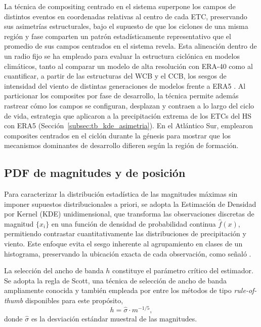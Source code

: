 La técnica de compositing centrado en el sistema superpone los campos de distintos eventos en coordenadas relativas al centro de cada ETC, preservando sus asimetrías estructurales, bajo el supuesto de que los ciclones de una misma región y fase comparten un patrón estadísticamente representativo que el promedio de sus campos centrados en el sistema revela.
Esta alineación dentro de un radio fijo se ha empleado para evaluar la estructura ciclónica en modelos climáticos, tanto al comparar un modelo de alta resolución con ERA-40 \citep{catto2010climate} como al cuantificar, a partir de las estructuras del WCB y el CCB, los sesgos de intensidad del viento de distintas generaciones de modelos frente a ERA5 \citep{priestley2022improved}.
Al particionar los composites por fase de desarrollo, la técnica permite además rastrear cómo los campos se configuran, desplazan y contraen a lo largo del ciclo de vida, estrategia que \citet{mcerlich2023extremes} aplicaron a la precipitación extrema de los ETCs del HS con ERA5 (Sección~\ref{subsec:tb_kde_asimetria}).
En el Atlántico Sur, \citet{gramcianinov2019properties} emplearon composites centrados en el ciclón durante la génesis para mostrar que los mecanismos dominantes de desarrollo difieren según la región de formación.

\subsection{PDF de magnitudes y de posición}\label{subsec:tb_kde}

Para caracterizar la distribución estadística de las magnitudes máximas sin imponer supuestos distribucionales a priori, se adopta la Estimación de Densidad por Kernel (KDE) unidimensional, que transforma las observaciones discretas de magnitud $\{x_i\}$ en una función de densidad de probabilidad continua $\hat{f}(x)$, permitiendo contrastar cuantitativamente las distribuciones de precipitación y viento.
Este enfoque evita el sesgo inherente al agrupamiento en clases de un histograma, preservando la ubicación exacta de cada observación, como señaló \citet{weglarczyk2018kernel}.

La selección del ancho de banda $h$ constituye el parámetro crítico del estimador. Se adopta la regla
de Scott, una técnica de selección de ancho de banda ampliamente conocida y también empleada por \citet{weglarczyk2018kernel} entre los métodos de tipo \textit{rule-of-thumb} disponibles para este propósito,
\begin{equation}\label{eq:scott_rule}
h = \hat{\sigma} \cdot m^{-1/5},
\end{equation}
donde $\hat{\sigma}$ es la desviación estándar muestral de las magnitudes.


